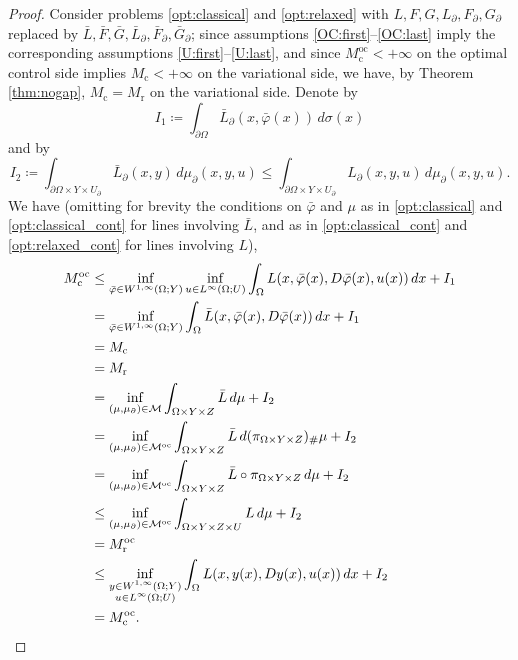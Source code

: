 \documentclass{article}
\theoremstyle{definition}
\theoremstyle{remark}
\newcommand{\proj}{\pi}
\newcommand{\projXYZ}{\proj_{\Omega\times Y\times Z}}
\begin{document}
\begin{proof}
 Consider problems \eqref{opt:classical} and \eqref{opt:relaxed} with $L,F,G,L_\partial,F_\partial,G_\partial$ replaced by $\bar L,\bar F,\bar G,\bar L_\partial,\bar F_\partial,\bar G_\partial$; since assumptions \ref{OC:first}--\ref{OC:last} imply the corresponding assumptions \ref{U:first}--\ref{U:last}, and since $M_\mathrm{c}^\mathrm{oc}<+\infty$ on the optimal control side implies $M_\mathrm{c}<+\infty$ on the variational side, we have, by Theorem \ref{thm:nogap}, $M_{\mathrm{c}}=M_{\mathrm{r}}$ on the variational side.
 Denote by  
 \[I_1\coloneqq\int_{\partial\Omega}\bar L_\partial(x,\bar\varphi(x))\,d\sigma(x)\]
 and by
 \[I_2\coloneqq\int_{\partial\Omega\times Y\times U_\partial }\bar L_\partial(x,y)\,d\mu_\partial(x,y,u)\leq \int_{\partial\Omega\times Y\times U_\partial}L_\partial(x,y,u)\,d\mu_\partial(x,y,u).\]
 We have (omitting for brevity the conditions on $\bar\varphi$ and $\mu$ as in  \eqref{opt:classical} and \eqref{opt:classical_cont} for lines involving $\bar L$, and  as in \eqref{opt:classical_cont} and \eqref{opt:relaxed_cont} for lines involving $L$),
 \begin{align*}
     M^\mathrm{oc}_\mathrm{c}
     &\leq \inf_{\bar\varphi\in W^{1,\infty}(\Omega;Y)}\inf_{u\in L^\infty(\Omega; U)}\int_\Omega L(x,\bar\varphi(x),D\bar\varphi(x),u(x))\,dx+I_1\\
      &=\inf_{\bar\varphi\in W^{1,\infty}(\Omega;Y)}
      \int_\Omega \bar L(x,\bar\varphi(x),D\bar\varphi(x))\,dx+I_1\\
      &=M_\mathrm{c}\\
      &=M_\mathrm{r}\\
      &=\inf_{(\mu,\mu_\partial)\in \mathcal M}\int_{\Omega\times Y\times Z}\bar L\,d\mu+I_2\\
      &=\inf_{(\mu,\mu_\partial)\in \mathcal M^\mathrm{oc}}\int_{\Omega\times Y\times Z}\bar L\,d(\projXYZ{})_\#\mu+I_2\\
      &=\inf_{(\mu,\mu_\partial)\in \mathcal M^\mathrm{oc}}\int_{\Omega\times Y\times Z}\bar L\circ\projXYZ{}\,d\mu+I_2\\
      &\leq \inf_{(\mu,\mu_\partial)\in \mathcal M^\mathrm{oc}}\int_{\Omega\times Y\times Z\times U} L\,d\mu+I_2\\
      &= M^\mathrm{oc}_\mathrm{r}\\
      &\leq \inf_{\substack{y\in W^{1,\infty}(\Omega;Y)\\u\in L^\infty(\Omega;U)}}\int_\Omega L(x,y(x),Dy(x),u(x))\,dx+I_2\\
      &=M^\mathrm{oc}_\mathrm{c}.\qedhere
 \end{align*}
%
\end{proof}
\end{document}
